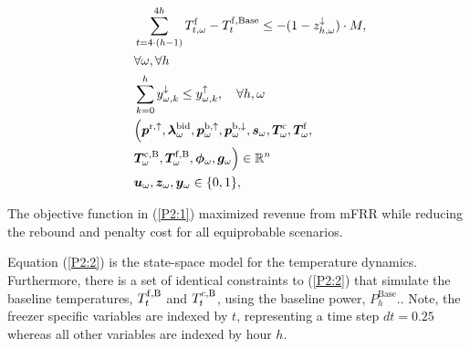 {\begin{subequations}
\begin{align}
        \quad                                                                                             & \quad \sum_{t=4\cdot(h-1)}^{4 h} T^{\rm{f}}_{t, \omega} - T^{\rm{f}, \text{Base}}_{t} \leq - (1 - z^{\downarrow}_{h, \omega}) \cdot M, \notag                                                                                                                                                                                                                                     \\ \quad & \quad  \forall{\omega}, \forall{h} \label{rebound:4}                                                                                                                                                                                 \\
        \quad                                                                                             & \quad \sum_{k=0}^{h} y^{\downarrow}_{\omega, k} \leq y^{\uparrow}_{\omega, k}, \quad \forall{h, \omega} \label{up_reg_first}                                                                                                                                                                                                                                                      \\
        \quad                                                                                             & \quad \Bigl( \bm{p}^{\rm{r},\uparrow}, \bm{\lambda}_{\omega}^{\text{bid}}, \bm{p}_{\omega}^{\rm{b},\uparrow}, \bm{p}_{\omega}^{\rm{b},\downarrow}, \bm{s}_{\omega}, \bm{T}_{\omega}^{\rm{c}}, \bm{T}_{\omega}^{\rm{f}}, \notag                                                                                                                                                    \\ \quad & \quad \bm{T}_{\omega}^{\rm{c,B}}, \bm{T}_{\omega}^{\rm{f,B}}, \bm{\phi}_{\omega}, \bm{g}_{\omega} \Bigr) \in \mathbb{R}^{n}  \label{P2:cont}
        \\
        \quad                                                                                             & \quad \bm{u}_{\omega}, \bm{z}_{\omega}, \bm{y}_{\omega} \in \{0,1\},  \label{P2:binary}
    \end{align}
\end{subequations}

The objective function in (\ref{P2:1}) maximized revenue from mFRR while reducing the rebound and penalty cost for all equiprobable scenarios.

Equation (\ref{P2:2}) is the state-space model for the temperature dynamics. Furthermore, there is a set of identical constraints to (\ref{P2:2}) that simulate the baseline temperatures, $T^{\rm{f},\rm{B}}_{t}$ and $T^{\rm{c},\rm{B}}_{t}$, using the baseline power, $P^{\text{Base}}_{h}$.. Note, the freezer specific variables are indexed by $t$, representing a time step $dt = 0.25$ whereas all other variables are indexed by hour $h$.

}
